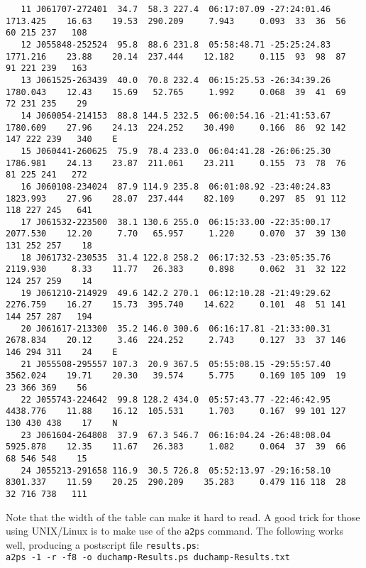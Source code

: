 {\begin{verbatim}
   11 J061707-272401  34.7  58.3 227.4  06:17:07.09 -27:24:01.46 1713.425    16.63    19.53  290.209     7.943     0.093  33  36  56  60 215 237   108     
   12 J055848-252524  95.8  88.6 231.8  05:58:48.71 -25:25:24.83 1771.216    23.88    20.14  237.444    12.182     0.115  93  98  87  91 221 239   163     
   13 J061525-263439  40.0  70.8 232.4  06:15:25.53 -26:34:39.26 1780.043    12.43    15.69   52.765     1.992     0.068  39  41  69  72 231 235    29     
   14 J060054-214153  88.8 144.5 232.5  06:00:54.16 -21:41:53.67 1780.609    27.96    24.13  224.252    30.490     0.166  86  92 142 147 222 239   340    E
   15 J060441-260625  75.9  78.4 233.0  06:04:41.28 -26:06:25.30 1786.981    24.13    23.87  211.061    23.211     0.155  73  78  76  81 225 241   272     
   16 J060108-234024  87.9 114.9 235.8  06:01:08.92 -23:40:24.83 1823.993    27.96    28.07  237.444    82.109     0.297  85  91 112 118 227 245   641     
   17 J061532-223500  38.1 130.6 255.0  06:15:33.00 -22:35:00.17 2077.530    12.20     7.70   65.957     1.220     0.070  37  39 130 131 252 257    18     
   18 J061732-230535  31.4 122.8 258.2  06:17:32.53 -23:05:35.76 2119.930     8.33    11.77   26.383     0.898     0.062  31  32 122 124 257 259    14     
   19 J061210-214929  49.6 142.2 270.1  06:12:10.28 -21:49:29.62 2276.759    16.27    15.73  395.740    14.622     0.101  48  51 141 144 257 287   194     
   20 J061617-213300  35.2 146.0 300.6  06:16:17.81 -21:33:00.31 2678.834    20.12     3.46  224.252     2.743     0.127  33  37 146 146 294 311    24    E
   21 J055508-295557 107.3  20.9 367.5  05:55:08.15 -29:55:57.40 3562.024    19.71    20.30   39.574     5.775     0.169 105 109  19  23 366 369    56     
   22 J055743-224642  99.8 128.2 434.0  05:57:43.77 -22:46:42.95 4438.776    11.88    16.12  105.531     1.703     0.167  99 101 127 130 430 438    17    N
   23 J061604-264808  37.9  67.3 546.7  06:16:04.24 -26:48:08.04 5925.878    12.35    11.67   26.383     1.082     0.064  37  39  66  68 546 548    15     
   24 J055213-291658 116.9  30.5 726.8  05:52:13.97 -29:16:58.10 8301.337    11.59    20.25  290.209    35.283     0.479 116 118  28  32 716 738   111     
  \end{verbatim}
}
Note that the
width of the table can make it hard to read. A good trick for those
using UNIX/Linux is to make use of the \texttt{a2ps} command. The
following works well, producing a postscript file \texttt{results.ps}:
\\\verb|a2ps -1 -r -f8 -o duchamp-Results.ps duchamp-Results.txt|
